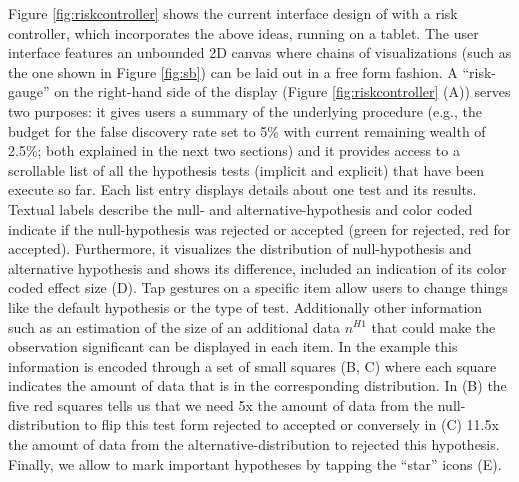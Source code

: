 Figure \ref{fig:riskcontroller}	shows the current interface design of \system{} with a risk controller, which incorporates the above ideas, running on a tablet. 
The user interface features an unbounded 2D canvas where chains of visualizations (such as the one shown in Figure \ref{fig:sb}) can be laid out in a free form fashion. 
A ``risk-gauge'' on the right-hand side of the display (Figure \ref{fig:riskcontroller} (A)) serves two purposes: 
it gives users a summary of the underlying procedure (e.g., the budget for the false discovery rate set to 5\% with current remaining wealth of 2.5\%; %
both explained in the next two sections) and it provides access to a scrollable list of all the hypothesis tests (implicit and explicit) that have been execute so far. 
Each list entry displays details about one test and its results.
Textual labels describe the null- and alternative-hypothesis and color coded \pvals  indicate if the null-hypothesis was rejected or accepted (green for rejected, red for accepted).  
Furthermore, it visualizes the distribution of null-hypothesis and alternative hypothesis and shows its difference, included an indication of its color coded effect size (D). 
Tap gestures on a specific item allow users to change things like the default hypothesis or the type of test.  
Additionally other information such as an estimation of the size of an additional data  $n^{H1}$ that could make the observation significant can be displayed in each item. 
In the example this information is encoded through a set of small squares (B, C) where each square indicates the amount of data that is in the corresponding distribution. In (B) the five red squares tells us that we need 5x the amount of data from the null-distribution to flip this test form rejected to accepted or conversely in (C) 11.5x the amount of data from the alternative-distribution to rejected this hypothesis. 
Finally, we allow to mark important hypotheses by tapping the ``star'' icons (E). 





